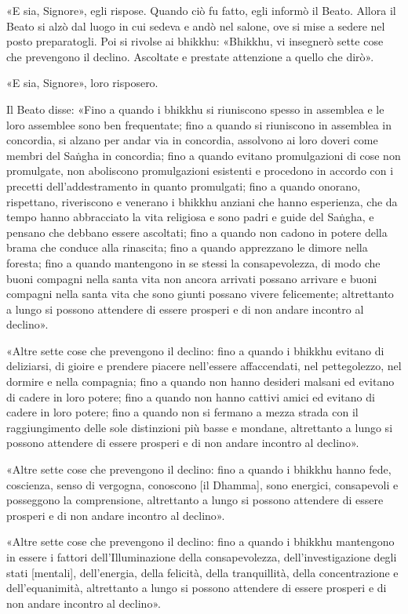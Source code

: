 «E sia, Signore», egli rispose. Quando ciò fu fatto, egli informò il Beato.
Allora il Beato si alzò dal luogo in cui sedeva e andò nel salone, ove si mise a
sedere nel posto preparatogli. Poi si rivolse ai bhikkhu: «Bhikkhu, vi insegnerò
sette cose che prevengono il declino. Ascoltate e prestate attenzione a quello
che dirò».

«E sia, Signore», loro risposero.

Il Beato disse: «Fino a quando i bhikkhu si riuniscono spesso in assemblea e le
loro assemblee sono ben frequentate; fino a quando si riuniscono in assemblea in
concordia, si alzano per andar via in concordia, assolvono ai loro doveri come
membri del Saṅgha in concordia; fino a quando evitano promulgazioni di cose non
promulgate, non aboliscono promulgazioni esistenti e procedono in accordo con i
precetti dell’addestramento in quanto promulgati; fino a quando onorano,
rispettano, riveriscono e venerano i bhikkhu anziani che hanno esperienza, che
da tempo hanno abbracciato la vita religiosa e sono padri e guide del Saṅgha, e
pensano che debbano essere ascoltati; fino a quando non cadono in potere della
brama che conduce alla rinascita; fino a quando apprezzano le dimore nella
foresta; fino a quando mantengono in se stessi la consapevolezza, di modo che
buoni compagni nella santa vita non ancora arrivati possano arrivare e buoni
compagni nella santa vita che sono giunti possano vivere felicemente;
altrettanto a lungo si possono attendere di essere prosperi e di non andare
incontro al declino».

«Altre sette cose che prevengono il declino: fino a quando i bhikkhu evitano di
deliziarsi, di gioire e prendere piacere nell’essere affaccendati, nel
pettegolezzo, nel dormire e nella compagnia; fino a quando non hanno desideri
malsani ed evitano di cadere in loro potere; fino a quando non hanno cattivi
amici ed evitano di cadere in loro potere; fino a quando non si fermano a mezza
strada con il raggiungimento delle sole distinzioni più basse e mondane,
altrettanto a lungo si possono attendere di essere prosperi e di non andare
incontro al declino».

«Altre sette cose che prevengono il declino: fino a quando i bhikkhu hanno fede,
coscienza, senso di vergogna, conoscono [il Dhamma], sono energici, consapevoli
e posseggono la comprensione, altrettanto a lungo si possono attendere di essere
prosperi e di non andare incontro al declino».

«Altre sette cose che prevengono il declino: fino a quando i bhikkhu mantengono
in essere i fattori dell’Illuminazione della consapevolezza, dell’investigazione
degli stati [mentali], dell’energia, della felicità, della tranquillità, della
concentrazione e dell’equanimità, altrettanto a lungo si possono attendere di
essere prosperi e di non andare incontro al declino».

